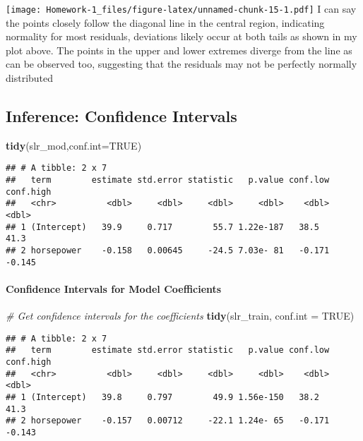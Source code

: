 \documentclass[
]{article}
\newenvironment{Shaded}{\begin{snugshade}}{\end{snugshade}}
\newcommand{\AttributeTok}[1]{\textcolor[rgb]{0.13,0.29,0.53}{#1}}
\newcommand{\CommentTok}[1]{\textcolor[rgb]{0.56,0.35,0.01}{\textit{#1}}}
\newcommand{\ConstantTok}[1]{\textcolor[rgb]{0.56,0.35,0.01}{#1}}
\newcommand{\FunctionTok}[1]{\textcolor[rgb]{0.13,0.29,0.53}{\textbf{#1}}}
\newcommand{\NormalTok}[1]{#1}
\begin{document}
\texttt{[image: Homework-1\_files/figure-latex/unnamed-chunk-15-1.pdf]} I
can say the points closely follow the diagonal line in the central
region, indicating normality for most residuals, deviations likely occur
at both tails as shown in my plot above. The points in the upper and
lower extremes diverge from the line as can be observed too, suggesting
that the residuals may not be perfectly normally distributed

\subsection{Inference: Confidence
Intervals}\label{inference-confidence-intervals}

\begin{Shaded}
\begin{Highlighting}[]
\FunctionTok{tidy}\NormalTok{(slr\_mod,}\AttributeTok{conf.int=}\ConstantTok{TRUE}\NormalTok{)}
\end{Highlighting}
\end{Shaded}

\begin{verbatim}
## # A tibble: 2 x 7
##   term        estimate std.error statistic   p.value conf.low conf.high
##   <chr>          <dbl>     <dbl>     <dbl>     <dbl>    <dbl>     <dbl>
## 1 (Intercept)   39.9     0.717        55.7 1.22e-187   38.5      41.3  
## 2 horsepower    -0.158   0.00645     -24.5 7.03e- 81   -0.171    -0.145
\end{verbatim}

\paragraph{Confidence Intervals for Model
Coefficients}\label{confidence-intervals-for-model-coefficients}

\begin{Shaded}
\begin{Highlighting}[]
\CommentTok{\# Get confidence intervals for the coefficients}
\FunctionTok{tidy}\NormalTok{(slr\_train, }\AttributeTok{conf.int =} \ConstantTok{TRUE}\NormalTok{)}
\end{Highlighting}
\end{Shaded}

\begin{verbatim}
## # A tibble: 2 x 7
##   term        estimate std.error statistic   p.value conf.low conf.high
##   <chr>          <dbl>     <dbl>     <dbl>     <dbl>    <dbl>     <dbl>
## 1 (Intercept)   39.8     0.797        49.9 1.56e-150   38.2      41.3  
## 2 horsepower    -0.157   0.00712     -22.1 1.24e- 65   -0.171    -0.143
\end{verbatim}
\end{document}
